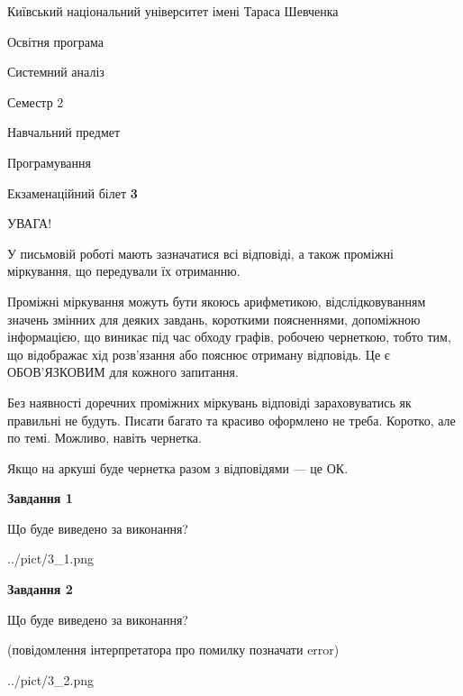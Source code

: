 \documentclass[12pt, ukrainian]{article}
\begin{document}
{{\begin {small}\par
{ \center  Київський національний університет імені Тараса Шевченка \par}
{\parbox {5 cm}{Освітня програма \hfill}{\parbox {7 cm}{Системний аналіз \hfill}}\parbox {6 cm}{\hfill Семестр 2}}\par
{\parbox {5 cm} {Навчальний предмет \hfill}\parbox {7 cm}{Програмування \hfill}\parbox {6cm}{\hfill}\par}\vspace{-7pt} \end{small}}{\center Екзаменаційний білет \No \textbf
{ 3 }\par}}
{
\begin {large}
УВАГА!

У письмовій роботі мають зазначатися всі відповіді, а також проміжні міркування, що передували їх отриманню.

Проміжні міркування можуть бути якоюсь арифметикою, відслідковуванням зна\-чень змінних для деяких завдань,
короткими поясненнями, допоміжною інформацією, що виникає під час обходу графів, робочею чернеткою,
тобто тим, що відображає хід розв’язання або пояснює отриману відповідь.
Це є ОБОВ’ЯЗКОВИМ для кожного запитання.

Без наявності доречних проміжних міркувань відповіді зараховуватись як правиль\-ні не будуть.
Писати багато та красиво оформлено не треба. Коротко, але по темі. Можли\-во, навіть чернетка.

Якщо на аркуші буде чернетка разом з відповідями --- це ОК.

\newpage

{\begin {center}\textbf{Завдання 1}\end {center}}\par
Що буде виведено за виконання?\par
\begin{center}
	{../pict/3_1.png}
\end{center}
\newpage

{\begin {center}\textbf{Завдання 2}\end {center}}\par
Що буде виведено за виконання?\par
 (повідомлення інтерпретатора про помилку позначати error)\par
\begin{center}
	{../pict/3_2.png}
\end{center}
\newpage


\end{large}}
\end{document}
